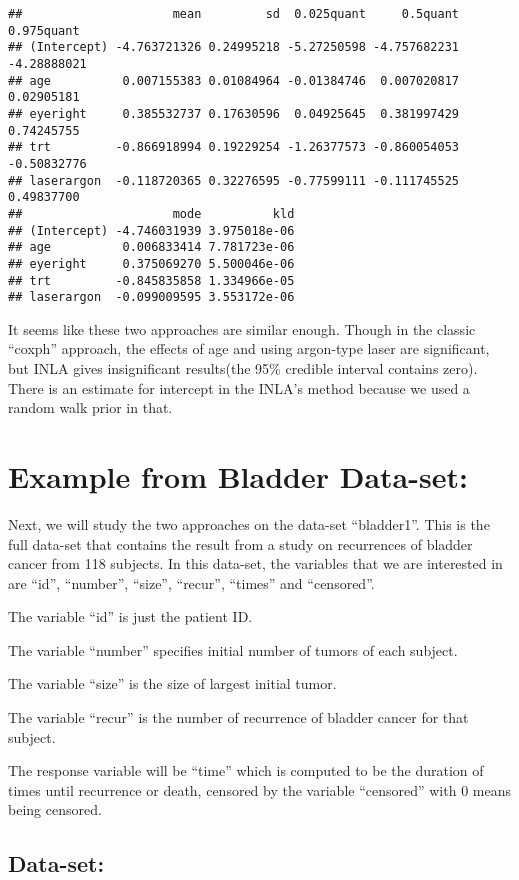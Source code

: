 \documentclass[]{article}
\begin{document}
\begin{verbatim}
##                     mean         sd  0.025quant     0.5quant  0.975quant
## (Intercept) -4.763721326 0.24995218 -5.27250598 -4.757682231 -4.28888021
## age          0.007155383 0.01084964 -0.01384746  0.007020817  0.02905181
## eyeright     0.385532737 0.17630596  0.04925645  0.381997429  0.74245755
## trt         -0.866918994 0.19229254 -1.26377573 -0.860054053 -0.50832776
## laserargon  -0.118720365 0.32276595 -0.77599111 -0.111745525  0.49837700
##                     mode          kld
## (Intercept) -4.746031939 3.975018e-06
## age          0.006833414 7.781723e-06
## eyeright     0.375069270 5.500046e-06
## trt         -0.845835858 1.334966e-05
## laserargon  -0.099009595 3.553172e-06
\end{verbatim}

It seems like these two approaches are similar enough. Though in the
classic ``coxph'' approach, the effects of age and using argon-type
laser are significant, but INLA gives insignificant results(the 95\%
credible interval contains zero). There is an estimate for intercept in
the INLA's method because we used a random walk prior in that.

\hypertarget{example-from-bladder-data-set}{%
\section{Example from Bladder
Data-set:}\label{example-from-bladder-data-set}}

Next, we will study the two approaches on the data-set ``bladder1''.
This is the full data-set that contains the result from a study on
recurrences of bladder cancer from 118 subjects. In this data-set, the
variables that we are interested in are ``id'', ``number'', ``size'',
``recur'', ``times'' and ``censored''.

The variable ``id'' is just the patient ID.

The variable ``number'' specifies initial number of tumors of each
subject.

The variable ``size'' is the size of largest initial tumor.

The variable ``recur'' is the number of recurrence of bladder cancer for
that subject.

The response variable will be ``time'' which is computed to be the
duration of times until recurrence or death, censored by the variable
``censored'' with 0 means being censored.

\hypertarget{data-set-1}{%
\subsection{Data-set:}\label{data-set-1}}
\end{document}
